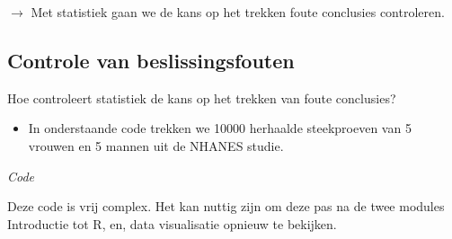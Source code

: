 \documentclass[
  12pt,dutch,coursenotes]{book}
\providecommand{\tightlist}{%
  \setlength{\itemsep}{0pt}\setlength{\parskip}{0pt}}
\theoremstyle{definition}
\theoremstyle{definition}
\theoremstyle{definition}
\theoremstyle{remark}
\begin{document}
\(\rightarrow\) Met statistiek gaan we de kans op het trekken foute conclusies controleren.

\hypertarget{controle-van-beslissingsfouten}{%
\subsection{Controle van beslissingsfouten}\label{controle-van-beslissingsfouten}}

Hoe controleert statistiek de kans op het trekken van foute conclusies?

\begin{itemize}
\tightlist
\item
  In onderstaande code trekken we 10000 herhaalde steekproeven van 5 vrouwen en 5 mannen uit de NHANES studie.
\end{itemize}

\emph{Code}

Deze code is vrij complex. Het kan nuttig zijn om deze pas na de twee modules Introductie tot R, en, data visualisatie opnieuw te bekijken.
\end{document}
